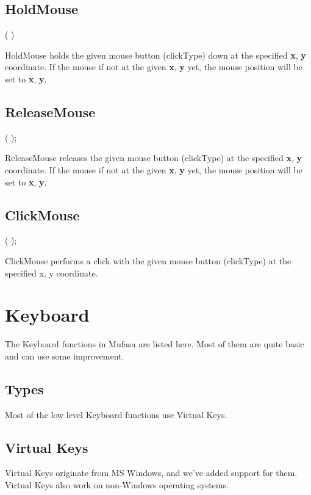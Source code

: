 \documentclass[a4paper]{report}
\begin{document}
\subsection{HoldMouse}
\pproc {}(  
)

HoldMouse holds the given mouse button (clickType) down at the specified \textbf{x}, \textbf{y} 
coordinate. If the mouse if not at the given \textbf{x}, \textbf{y} yet, the mouse position
will be set to \textbf{x}, \textbf{y}.

\subsection{ReleaseMouse}
\pproc {}(   );

ReleaseMouse releases the given mouse button (clickType) at the specified \textbf{x}, \textbf{y} 
coordinate. If the mouse if not at the given \textbf{x}, \textbf{y} yet, the mouse position
will be set to \textbf{x}, \textbf{y}.

\subsection{ClickMouse}
\pproc {}(  
);

ClickMouse performs a click with the given mouse button (clickType) at the
specified x, y coordinate.

\section{Keyboard}

The Keyboard functions in Mufasa are listed here.
Most of them are quite basic and can use some improvement.

\subsection{Types}

Most of the low level Keyboard functions use Virtual Keys.

\subsection{Virtual Keys}

Virtual Keys originate from MS Windows, and we've added support for them.
Virtual Keys also work on non-Windows operating systems.
\end{document}
